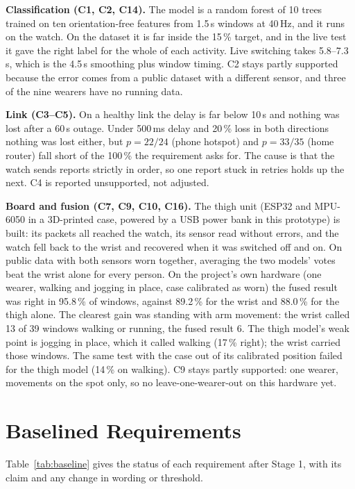 \documentclass[conference]{IEEEtran}
\begin{document}
\textbf{Classification (C1, C2, C14).} The model is a random forest
of 10 trees trained on ten orientation-free features from 1.5\,s
windows at 40\,Hz, and it runs on the watch. On the dataset it is
far inside the 15\,\% target, and in the live test it gave the right
label for the whole of each activity. Live switching takes 5.8--7.3\,s,
which is the 4.5\,s smoothing plus window timing. C2 stays partly
supported because the error comes from a public dataset with a
different sensor, and three of the nine wearers have no running
data.

\textbf{Link (C3--C5).} On a healthy link the delay is far below
10\,s and nothing was lost after a 60\,s outage. Under 500\,ms delay
and 20\,\% loss in both directions nothing was lost either, but
$p=22/24$ (phone hotspot) and $p=33/35$ (home router) fall short of the
100\,\% the requirement asks for.
The cause is that the watch sends reports strictly in order, so one
report stuck in retries holds up the next. C4 is reported
unsupported, not adjusted.

\textbf{Board and fusion (C7, C9, C10, C16).} The thigh unit (ESP32
and MPU-6050 in a 3D-printed case, powered by a USB power bank in this
prototype) is built: its packets all reached
the watch, its sensor read without errors, and the watch fell back to
the wrist and recovered when it was switched off and on. On public
data with both sensors worn together, averaging the two models' votes
beat the wrist alone for every person. On the project's own hardware (one wearer, walking and
jogging in place, case calibrated as worn) the fused result was right
in 95.8\,\% of windows, against 89.2\,\% for the wrist and 88.0\,\% for
the thigh alone. The clearest gain was standing with arm movement: the
wrist called 13 of 39 windows walking or running, the fused result 6.
The thigh model's weak point is jogging in place, which it called
walking (17\,\% right); the wrist carried those windows. The same test
with the case out of its calibrated position failed for the thigh model
(14\,\% on walking). C9 stays partly supported: one wearer, movements
on the spot only, so no leave-one-wearer-out on this hardware yet.

\section{Baselined Requirements}
\label{sec:baseline}
Table~\ref{tab:baseline} gives the status of each requirement after
Stage 1, with its claim and any change in wording or threshold.
\end{document}
